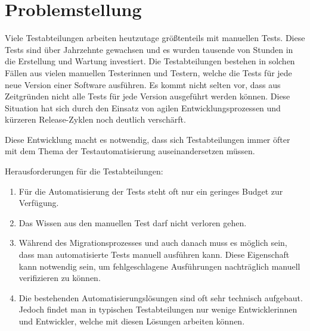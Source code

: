 
\section{Problemstellung}

Viele Testabteilungen arbeiten heutzutage größtenteils mit manuellen Tests. Diese Tests sind über Jahrzehnte gewachsen und es wurden tausende von Stunden in die Erstellung und Wartung investiert. Die Testabteilungen bestehen in solchen Fällen aus vielen manuellen Testerinnen und Testern, welche die Tests für jede neue Version einer Software ausführen. Es kommt nicht selten vor, dass aus Zeitgründen nicht alle Tests für jede Version ausgeführt werden können. Diese Situation hat sich durch den Einsatz von agilen Entwicklungsprozessen und kürzeren Release-Zyklen noch deutlich verschärft. 

\SuperPar
Diese Entwicklung macht es notwendig, dass sich Testabteilungen immer öfter mit dem Thema der Testautomatisierung auseinandersetzen müssen. 

\SuperPar
Herausforderungen für die Testabteilungen:\\

\begin{enumerate}

\item Für die Automatisierung der Tests steht oft nur ein geringes Budget zur Verfügung.\\
	
\item Das Wissen aus den manuellen Test darf nicht verloren gehen.\\
	
\item Während des Migrationsprozesses und auch danach muss es möglich sein, dass man automatisierte Tests manuell ausführen kann. Diese Eigenschaft kann notwendig sein, um fehlgeschlagene Ausführungen nachträglich manuell verifizieren zu können.\\

\item Die bestehenden Automatisierungslösungen sind oft sehr technisch aufgebaut. Jedoch findet man in typischen Testabteilungen nur wenige Entwicklerinnen und Entwickler, welche mit diesen Lösungen arbeiten können.

\end{enumerate}

